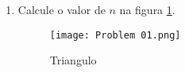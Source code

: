 \documentclass[a4paper]{article}
\begin{document}
\begin{enumerate}

	\item Calcule o valor de $n$ na figura \ref{Rotulo01}.
	
	\begin{figure}[htp]
		
		\centering
		\texttt{[image: Problem 01.png]}
		\caption{Triangulo}
		\label{Rotulo01}
	
	\end{figure}

\end{enumerate}
\end{document}
